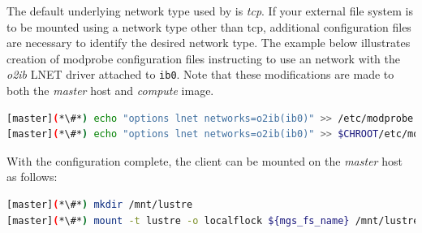 \documentclass[letterpaper]{article}
\begin{document}
The default underlying network type used by \Lustre{} is {\em tcp}. If your
external \Lustre{} file system is to be mounted using a network type other than
tcp, additional configuration files are necessary to identify the desired
network type. The example below illustrates creation of modprobe configuration files
instructing \Lustre{} to use an \InfiniBand{} network with the {\em o2ib} LNET driver
attached to \texttt{ib0}. Note that these modifications are made to both the
{\em master} host and {\em compute} image.

\begin{lstlisting}[language=bash,keywords={},upquote=true]
[master](*\#*) echo "options lnet networks=o2ib(ib0)" >> /etc/modprobe.d/lustre.conf
[master](*\#*) echo "options lnet networks=o2ib(ib0)" >> $CHROOT/etc/modprobe.d/lustre.conf
\end{lstlisting}

With the \Lustre{} configuration complete, the client can be mounted on the {\em master}
host as follows:
\begin{lstlisting}[language=bash,keywords={},upquote=true]
[master](*\#*) mkdir /mnt/lustre
[master](*\#*) mount -t lustre -o localflock ${mgs_fs_name} /mnt/lustre
\end{lstlisting}

\end{document}

